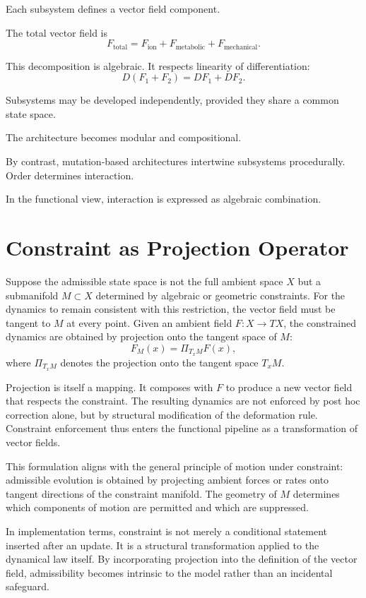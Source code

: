 \documentclass[12pt]{book}
\begin{document}
Each subsystem defines a vector field component.

The total vector field is
\[
F_{\text{total}} = F_{\text{ion}} + F_{\text{metabolic}} + F_{\text{mechanical}}.
\]

This decomposition is algebraic. It respects linearity of differentiation:
\[
D(F_1 + F_2) = DF_1 + DF_2.
\]

Subsystems may be developed independently, provided they share a common state space.

The architecture becomes modular and compositional.

By contrast, mutation-based architectures intertwine subsystems procedurally. Order determines interaction.

In the functional view, interaction is expressed as algebraic combination.

\section{Constraint as Projection Operator}

Suppose the admissible state space is not the full ambient space $X$
but a submanifold $M \subset X$ determined by algebraic or geometric
constraints. For the dynamics to remain consistent with this
restriction, the vector field must be tangent to $M$ at every point.
Given an ambient field $F : X \to TX$, the constrained dynamics are
obtained by projection onto the tangent space of $M$:
\[
F_M(x) = \Pi_{T_x M} F(x),
\]
where $\Pi_{T_x M}$ denotes the projection onto the tangent space
$T_x M$.

Projection is itself a mapping. It composes with $F$ to produce a new
vector field that respects the constraint. The resulting dynamics are
not enforced by post hoc correction alone, but by structural
modification of the deformation rule. Constraint enforcement thus
enters the functional pipeline as a transformation of vector fields.

This formulation aligns with the general principle of motion under
constraint: admissible evolution is obtained by projecting ambient
forces or rates onto tangent directions of the constraint manifold.
The geometry of $M$ determines which components of motion are
permitted and which are suppressed.

In implementation terms, constraint is not merely a conditional
statement inserted after an update. It is a structural transformation
applied to the dynamical law itself. By incorporating projection into
the definition of the vector field, admissibility becomes intrinsic to
the model rather than an incidental safeguard.
\end{document}
